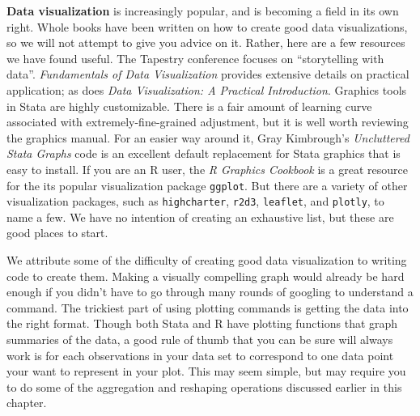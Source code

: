 \textbf{Data visualization} 
is increasingly popular, 
and is becoming a field in its own right.\cite{healy2018data,wilke2019fundamentals}
Whole books have been written on how to create good data visualizations,
so we will not attempt to give you advice on it.
Rather, here are a few resources we have found useful.
The Tapestry conference focuses on ``storytelling with data''.
\textit{Fundamentals of Data Visualization} provides extensive details on practical application;
as does \textit{Data Visualization: A Practical Introduction}.
Graphics tools in Stata are highly customizable.
There is a fair amount of learning curve associated with extremely-fine-grained adjustment,
but it is well worth reviewing the graphics manual.
For an easier way around it, Gray Kimbrough's 
\textit{Uncluttered Stata Graphs}
code is an excellent default replacement for Stata graphics that is easy to install.
If you are an R user, the \textit{R Graphics Cookbook}
is a great resource for the its popular visualization package \texttt{ggplot}.
But there are a variety of other visualization packages,
such as \texttt{highcharter},
\texttt{r2d3},
\texttt{leaflet},
and \texttt{plotly}, to name a few.
We have no intention of creating an exhaustive list, 
but these are good places to start.

We attribute some of the difficulty of creating good data visualization
to writing code to create them.
Making a visually compelling graph would already be hard enough if
you didn't have to go through many rounds of googling to understand a command.
The trickiest part of using plotting commands is getting the data into the right format.
Though both Stata and R have plotting functions that graph summaries of the data,
a good rule of thumb that you can be sure will always work is for each
observations in your data set to correspond to one data point your want 
to represent in your plot.
This may seem simple, 
but may require you to do some of the aggregation and reshaping operations
discussed earlier in this chapter.

